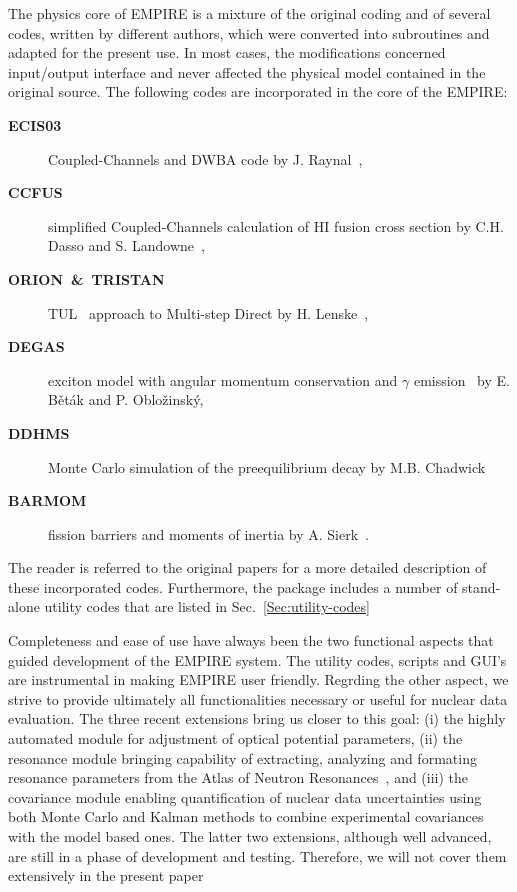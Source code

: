 \documentclass[twocolumn,amsmath,amssymb,10pt,groupedaddress,a4paper]{revtex4}
\begin{document}
The physics core of EMPIRE is a mixture of the original coding and of several codes, written by different authors, which
were converted into subroutines and adapted for the present use.
In most cases, the modifications concerned input/output interface
and never affected the physical model contained in the original source.
The following codes are incorporated in the core of the EMPIRE:
\begin{description}
\item [\textbf{ECIS03}]Coupled-Channels
and DWBA code by J. Raynal~\cite{ECIS},
\item [\textbf{CCFUS}]simplified Coupled-Channels calculation
of HI fusion cross section by C.H. Dasso and S. Landowne~\cite{CCFUS},
\item [\textbf{ORION~\&~TRISTAN}]TUL~\cite{TUL}
approach to Multi-step Direct by H. Lenske~\cite{ORTRI},
\item [\textbf{DEGAS}]exciton model with angular momentum
conservation and $\gamma$ emission~\cite{Degas} by E. B\v et\' ak
and P. Oblo\v zinsk\' y,
\item [\textbf{DDHMS}]Monte Carlo simulation of the preequilibrium
decay by M.B. Chadwick~\cite{DDHMScode}
\item [\textbf{BARMOM}]fission barriers and moments of inertia
by A. Sierk~\cite{sierk}.
\end{description}
The reader is referred to the original papers for a more detailed
description of these incorporated codes. Furthermore, the package
includes a number of stand-alone utility codes that are listed in Sec.~\ref{Sec:utility-codes}


Completeness and ease of use have always been the two functional aspects that guided development of the EMPIRE system.
The utility codes, scripts and GUI's are instrumental in making EMPIRE user friendly. Regrding the other aspect, we strive to provide ultimately all functionalities necessary or useful for nuclear data evaluation. The three recent extensions bring us closer to this goal: (i) the highly automated module for adjustment of optical potential parameters, (ii) the resonance module bringing capability of extracting, analyzing and formating resonance parameters from the Atlas of Neutron Resonances~\cite{Mughabghab:06}, and (iii) the covariance module enabling quantification of nuclear data uncertainties using both Monte Carlo and Kalman methods to combine experimental covariances with the model based ones. The latter two extensions, although well advanced, are still in a phase of development and testing. Therefore, we will not cover them extensively in the present paper
\end{document}
